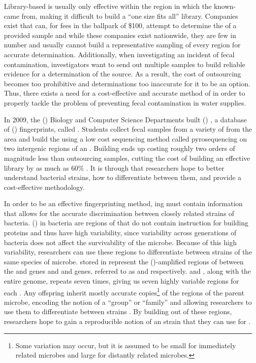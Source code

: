 Library-based \mst{} is usually only effective within the region in which the known-\spec{} \isols{} came from, making it difficult to build a ``one size fits all'' library.
Companies exist that can, for fees in the ballpark of \$100, attempt to determine the \spec{} of a provided sample
and while these companies exist nationwide, they are few in number and usually cannot build a representative sampling of every region for accurate \spec{} determination.
Additionally, when investigating an incident of fecal contamination, investigators want to send out multiple samples to build reliable evidence for a determination of the source.
As a result, the cost of outsourcing becomes too prohibitive and determinations too inaccurate for it to be an option.
Thus, there exists a need for a cost-effective and accurate method of \mst{} in order to properly tackle the problem of preventing fecal contamination in water supplies.

In 2009, the \cplong{} (\cp{}) Biology and Computer Science Departments built \cploplong{} (\cplop{}) \cite{soliman2013cplop}, a database of \ecolilong{} (\ecoli{}) \isol{} fingerprints, called \pyros{}.
Students collect fecal samples from a variety of \spec{} from the \slo{} area and build the \pyros{} using a low cost \dna{} sequencing method called pyrosequencing on two intergenic regions of an \ecoli{} \isol{}.
Building \pyros{} ends up costing roughly two orders of magnitude less than outsourcing samples, cutting the cost of building an effective \mst{} library by as much as 60\% \cite{Black2014121}.
It is through \cplop{} that \cp{} researchers hope to better understand bacterial strains, how to differentiate between them, and provide a cost-effective \mst{} methodology.

In order to be an effective \mst{} fingerprinting method, \pyro{}ing must contain information that allows for the accurate discrimination between closely related strains of \ecoli{} bacteria.
\ITSlongs{} (\itsshort{}) in bacteria are regions of \dna{} that do not contain instruction for building proteins and thus have high variability, since variability across generations of bacteria does not affect the survivability of the microbe.
Because of this high variability, researchers can use these regions to differentiate between strains of the same species of microbe.
\ecoli{} \isol{} \pyros{} stored in \cplop{} represent the \pcrlong{} (\pcr{})-amplified regions of \dna{} between the \Gsixt{} and \Gtwen{} genes and \Gtwen{} and \Gfive{} genes, referred to as \Ssixt{} and \Sfive{} respectively.
\Ssixt{} and \Sfive{}, along with the entire \ecoli{} genome, repeats seven times, giving us seven highly variable regions for each \itsshort{}.
Any offspring inherit mostly accurate copies\footnote{Some variation may occur, but it is assumed to be small for immediately related microbes and large for distantly related microbes.} of the \itsshort{} regions of the parent microbe, encoding the notion of a ``group'' or ``family'' and allowing researchers to use them to differentiate between strains \cite{SolimanDVMBNWKG12}.
By building \pyros{} out of these regions, \cplop{} researchers hope to gain a reproducible notion of an \ecoli{} strain that they can use for \mst{}.

